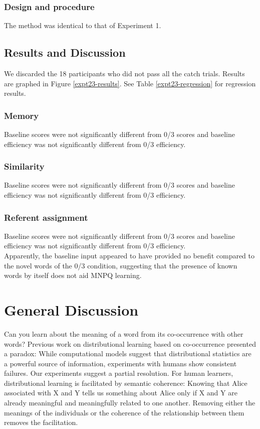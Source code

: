 \documentclass[man,floatsintext]{apa6}
\begin{document}
\subsubsection{Design and procedure}
The method was identical to that of Experiment 1.

\subsection{Results and Discussion}
We discarded the 18 participants who did not pass all the catch trials. Results are graphed in Figure \ref{expt23-results}. See Table \ref{expt23-regression} for regression results.

\subsubsection{Memory}
Baseline scores were not significantly different from 0/3 scores and baseline efficiency was not significantly different from 0/3 efficiency.

\subsubsection{Similarity}
Baseline scores were not significantly different from 0/3 scores and baseline efficiency was not significantly different from 0/3 efficiency.

\subsubsection{Referent assignment}
Baseline scores were not significantly different from 0/3 scores and baseline efficiency was not significantly different from 0/3 efficiency.\\

Apparently, the baseline input appeared to have provided no benefit compared to the novel words of the 0/3 condition, suggesting that the presence of known words by itself does not aid MNPQ learning.

\section{General Discussion}
Can you learn about the meaning of a word from its co-occurrence with other words? Previous work on distributional learning based on co-occurrence presented a paradox: While computational models suggest that distributional statistics are a powerful source of information, experiments with humans show consistent failures. Our experiments suggest a partial resolution. For human learners, distributional learning is facilitated by semantic coherence: Knowing that Alice associated with X and Y tells us something about Alice only if X and Y are already meaningful and meaningfully related to one another. Removing either the meanings of the individuals or the coherence of the relationship between them removes the facilitation. 
\end{document}
